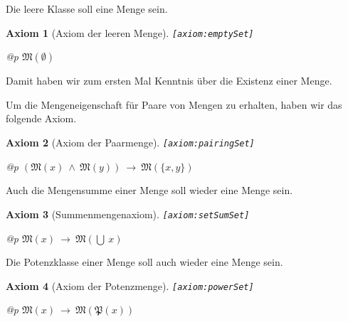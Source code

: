 \documentclass[a4paper,german,10pt,twoside]{book}
\newtheorem{ax}{Axiom}
\theoremstyle{definition}
\theoremstyle{remark}
\begin{document}
\par
Die leere Klasse soll eine Menge sein.

\begin{ax}[Axiom der leeren Menge]
\label{axiom:emptySet} \hypertarget{axiom:emptySet}{}
{\tt \tiny [\verb]axiom:emptySet]]}
\mbox{}
\begin{longtable}{{@{\extracolsep{\fill}}p{\linewidth}}}
\centering $\mathfrak{M}(\emptyset)$
\end{longtable}

\end{ax}

Damit haben wir zum ersten Mal Kenntnis {\"u}ber die Existenz einer Menge.


\par
Um die Mengeneigenschaft f{\"u}r Paare von Mengen zu erhalten, haben wir das
folgende Axiom.

\begin{ax}[Axiom der Paarmenge]
\label{axiom:pairingSet} \hypertarget{axiom:pairingSet}{}
{\tt \tiny [\verb]axiom:pairingSet]]}
\mbox{}
\begin{longtable}{{@{\extracolsep{\fill}}p{\linewidth}}}
\centering $(\mathfrak{M}(x)\ \land\ \mathfrak{M}(y))\ \rightarrow\ \mathfrak{M}(\{ x, y \})$
\end{longtable}

\end{ax}


\par
Auch die Mengensumme einer Menge soll wieder eine Menge sein.

\begin{ax}[Summenmengenaxiom]
\label{axiom:setSumSet} \hypertarget{axiom:setSumSet}{}
{\tt \tiny [\verb]axiom:setSumSet]]}
\mbox{}
\begin{longtable}{{@{\extracolsep{\fill}}p{\linewidth}}}
\centering $\mathfrak{M}(x)\ \rightarrow\ \mathfrak{M}(\bigcup \ x)$
\end{longtable}

\end{ax}


\par
Die Potenzklasse einer Menge soll auch wieder eine Menge sein.

\begin{ax}[Axiom der Potenzmenge]
\label{axiom:powerSet} \hypertarget{axiom:powerSet}{}
{\tt \tiny [\verb]axiom:powerSet]]}
\mbox{}
\begin{longtable}{{@{\extracolsep{\fill}}p{\linewidth}}}
\centering $\mathfrak{M}(x)\ \rightarrow\ \mathfrak{M}(\mathfrak{P}(x))$
\end{longtable}

\end{ax}
\end{document}
